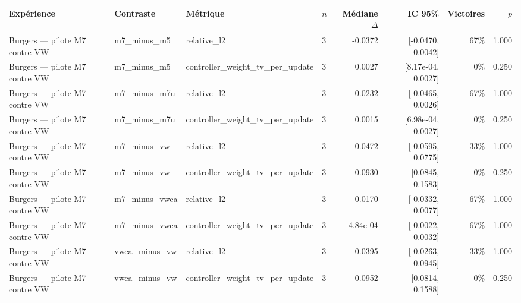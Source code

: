 \begin{tabular}{llllrrrr}
\toprule
Expérience & Contraste & Métrique & $n$ & Médiane $\Delta$ & IC 95\% & Victoires & $p$ \\
\midrule
Burgers — pilote M7 contre VW & m7\_minus\_m5 & relative\_l2 & 3 & -0.0372 & [-0.0470, 0.0042] & 67\% & 1.000 \\
Burgers — pilote M7 contre VW & m7\_minus\_m5 & controller\_weight\_tv\_per\_update & 3 & 0.0027 & [8.17e-04, 0.0027] & 0\% & 0.250 \\
Burgers — pilote M7 contre VW & m7\_minus\_m7u & relative\_l2 & 3 & -0.0232 & [-0.0465, 0.0026] & 67\% & 1.000 \\
Burgers — pilote M7 contre VW & m7\_minus\_m7u & controller\_weight\_tv\_per\_update & 3 & 0.0015 & [6.98e-04, 0.0027] & 0\% & 0.250 \\
Burgers — pilote M7 contre VW & m7\_minus\_vw & relative\_l2 & 3 & 0.0472 & [-0.0595, 0.0775] & 33\% & 1.000 \\
Burgers — pilote M7 contre VW & m7\_minus\_vw & controller\_weight\_tv\_per\_update & 3 & 0.0930 & [0.0845, 0.1583] & 0\% & 0.250 \\
Burgers — pilote M7 contre VW & m7\_minus\_vwca & relative\_l2 & 3 & -0.0170 & [-0.0332, 0.0077] & 67\% & 1.000 \\
Burgers — pilote M7 contre VW & m7\_minus\_vwca & controller\_weight\_tv\_per\_update & 3 & -4.84e-04 & [-0.0022, 0.0032] & 67\% & 1.000 \\
Burgers — pilote M7 contre VW & vwca\_minus\_vw & relative\_l2 & 3 & 0.0395 & [-0.0263, 0.0945] & 33\% & 1.000 \\
Burgers — pilote M7 contre VW & vwca\_minus\_vw & controller\_weight\_tv\_per\_update & 3 & 0.0952 & [0.0814, 0.1588] & 0\% & 0.250 \\
\bottomrule
\end{tabular}
